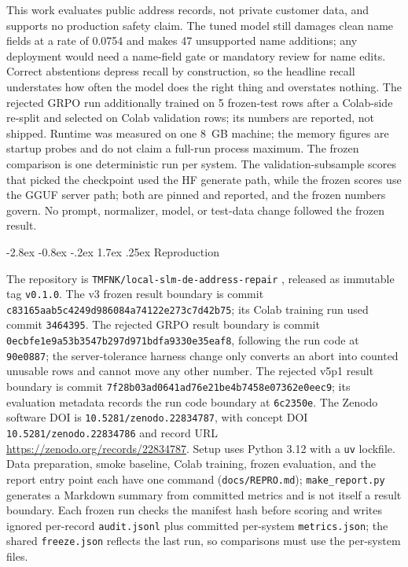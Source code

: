 \documentclass[11pt]{article}
\makeatletter
\renewcommand\section{\@startsection{section}{1}{\z@}%
  {-2.8ex \@plus -0.8ex \@minus -.2ex}%
  {1.7ex \@plus .25ex}%
  {\normalfont\Large\bfseries}}
\makeatother
\begin{document}
This work evaluates public address records, not private customer
data, and supports no production safety claim. The tuned model still
damages clean name fields at a rate of 0.0754 and makes 47 unsupported
name additions; any deployment would
need a name-field gate or mandatory review for name edits. Correct
abstentions depress recall by construction, so the headline recall
understates how often the model does the right thing and overstates
nothing. The rejected GRPO run additionally trained on 5 frozen-test
rows after a Colab-side re-split and selected on Colab validation rows;
its numbers are reported, not shipped. Runtime was measured on one 8~GB machine; the memory figures
are startup probes and do not claim a full-run process maximum. The
frozen comparison is one deterministic run per system. The
validation-subsample scores that
picked the checkpoint used the HF generate path, while the frozen
scores use the GGUF server path; both are pinned and reported, and
the frozen numbers govern. No prompt, normalizer, model, or test-data
change followed the frozen result.

\section{Reproduction}
\label{sec:repro}

The repository is \texttt{TMFNK/local-slm-de-address-repair}
\cite{repo}, released as immutable tag \texttt{v0.1.0}. The v3 frozen
result boundary is commit \texttt{c83165aab5c4249d986084a74122e273c7d42b75};
its Colab training run used commit \texttt{3464395}. The rejected GRPO
result boundary is commit \texttt{0ecbfe1e9a53b3547b297d971bdfa9330e35eaf8},
following the run code at \texttt{90e0887}; the server-tolerance harness
change only converts an abort into counted unusable rows and cannot move any
other number. The rejected v5p1 result boundary is commit
\texttt{7f28b03ad0641ad76e21be4b7458e07362e0eec9}; its evaluation metadata
records the run code boundary at \texttt{6c2350e}. The Zenodo software DOI is
\texttt{10.5281/zenodo.22834787}, with concept DOI
\texttt{10.5281/zenodo.22834786} and record URL
\url{https://zenodo.org/records/22834787}. Setup uses Python 3.12 with a \texttt{uv}
lockfile. Data preparation, smoke baseline, Colab training, frozen
evaluation, and the report entry point each have one command
(\texttt{docs/REPRO.md}); \texttt{make\_report.py} generates a Markdown
summary from committed metrics and is not itself a result boundary. Each
frozen run checks the
manifest hash before scoring and writes ignored per-record
\texttt{audit.jsonl} plus committed per-system \texttt{metrics.json};
the shared \texttt{freeze.json} reflects the last run, so comparisons
must use the per-system files.
\end{document}
